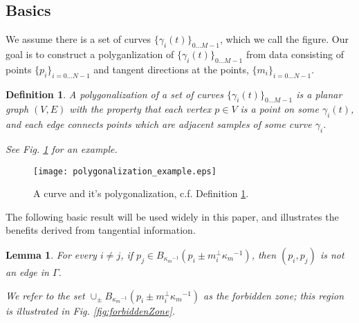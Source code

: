\documentclass{article}
\newtheorem{definition}[cntr]{Definition}
\newtheorem{lemma}[cntr]{Lemma}
\numberwithin{cntr}{section}
\numberwithin{equation}{section}
\newcommand{\Oto}[1]{{0 \ldots #1-1}}
\newcommand{\OtoN}{{0 \ldots N-1}}
\newcommand{\pointData}{{ \{ p_{i} \}_{i=\OtoN} }}
\newcommand{\tanData}{{ \{ m_{i} \}_{i=\OtoN} }}
\newcommand{\curveSet}{{ \{ \gamma_i(t) \}_{\Oto{M}}}}
\newcommand{\poly}{{\Gamma}}
\newcommand{\ball}[2]{ { B_{#1}(#2) } }
\newcommand{\kmax}{{\kappa_{m}}}
\newcommand{\kmaxi}{{\kmax^{-1}}}
\begin{document}
\subsection{Basics}

We assume there is a set of curves $\curveSet$, which we call the figure. Our goal is to construct a polyganlization of $\curveSet$ from data consisting of points $\pointData$ and tangent directions at the points, $\tanData$.

\begin{definition}
  \label{def:polygonalization}
  A polygonalization of a set of curves $\curveSet$ is a planar graph $(V,E)$ with the property that each vertex $p \in V$ is a point on some $\gamma_{i}(t)$, and each edge connects points which are adjacent samples of some curve $\gamma_{i}$.

  See Fig. \ref{fig:polygonalization} for an example.
\end{definition}

\begin{figure}
\setlength{\unitlength}{0.240900pt}
\ifx\plotpoint\undefined\newsavebox{\plotpoint}\fi
\sbox{\plotpoint}{\rule[-0.200pt]{0.400pt}{0.400pt}}%
\texttt{[image: polygonalization\_example.eps]}

\caption{A curve and it's polygonalization, c.f. Definition \ref{def:polygonalization}. }
\label{fig:polygonalization}
\end{figure}

The following basic result will be used widely in this paper, and illustrates the benefits derived from tangential information.
\begin{lemma}
  \label{lem:forbiddenZone}
  For every $i \neq j$, if $p_{j} \in \ball{\kmaxi}{p_{i} \pm m_{i}^{\perp} \kmaxi}$, then $(p_{i},p_{j})$ is not an edge in $\poly$.

  We refer to the set $\cup_{\pm} \ball{\kmaxi}{p_{i} \pm m_{i}^{\perp} \kmaxi}$ as the \emph{forbidden zone}; this region is illustrated in Fig. \ref{fig:forbiddenZone}.
\end{lemma}
\end{document}
